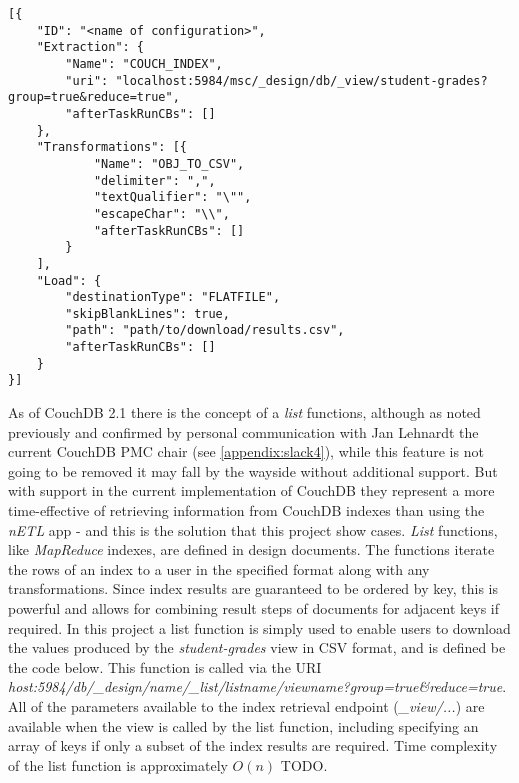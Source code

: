 \begin{verbatim}
[{
    "ID": "<name of configuration>",
    "Extraction": {
        "Name": "COUCH_INDEX",
        "uri": "localhost:5984/msc/_design/db/_view/student-grades?group=true&reduce=true",
        "afterTaskRunCBs": []
    },
    "Transformations": [{
            "Name": "OBJ_TO_CSV",
            "delimiter": ",",
            "textQualifier": "\"",
            "escapeChar": "\\",
            "afterTaskRunCBs": []
        }
    ],
    "Load": {
        "destinationType": "FLATFILE",
        "skipBlankLines": true,
        "path": "path/to/download/results.csv",
        "afterTaskRunCBs": []
    }
}]
\end{verbatim}

As of CouchDB 2.1 there is the concept of a \textit{list} functions, although as noted previously and confirmed by personal communication with Jan Lehnardt the current CouchDB PMC chair (see \ref{appendix:slack4}), while this feature is not going to be removed it may fall by the wayside without additional support. But with support in the current implementation of CouchDB they represent a more time-effective of retrieving information from CouchDB indexes than using the \textit{nETL} app - and this is the solution that this project show cases. \textit{List} functions, like \textit{MapReduce} indexes, are defined in design documents. The functions iterate the rows of an index to a user in the specified format along with any transformations. Since index results are guaranteed to be ordered by key, this is powerful and allows for combining result steps of documents for adjacent keys if required. In this project a list function is simply used to enable users to download the values produced by the \textit{student-grades} view in CSV format, and is defined be the code below. This function is called via the URI \textit{host:5984/db/\_design/name/\_list/listname/viewname?group=true\&reduce=true}. All of the parameters available to the index retrieval endpoint (\textit{\_view/...}) are available when the view is called by the list function, including specifying an array of keys if only a subset of the index results are required. Time complexity of the list function is approximately $ O(n) $ TODO.

